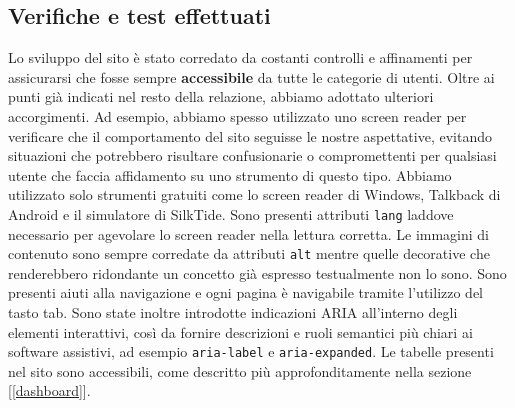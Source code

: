 \documentclass{article}
\begin{document}
\subsection{Verifiche e test effettuati}
Lo sviluppo del sito è stato corredato da costanti controlli e affinamenti per assicurarsi che fosse sempre \textbf{accessibile} da tutte le categorie di utenti. Oltre ai punti già indicati nel resto della relazione, abbiamo adottato ulteriori accorgimenti. Ad esempio, abbiamo spesso utilizzato uno screen reader per verificare che il comportamento del sito seguisse le nostre aspettative, evitando situazioni che potrebbero risultare confusionarie o compromettenti per qualsiasi utente che faccia affidamento su uno strumento di questo tipo. Abbiamo utilizzato solo strumenti gratuiti come lo screen reader di Windows, Talkback di Android e il simulatore di SilkTide. Sono presenti attributi \verb|lang| laddove necessario per agevolare lo screen reader nella lettura corretta. Le immagini di contenuto sono sempre corredate da attributi \verb|alt| mentre quelle decorative che renderebbero ridondante un concetto già espresso testualmente non lo sono. Sono presenti aiuti alla navigazione e ogni pagina è navigabile tramite l'utilizzo del tasto tab. Sono state inoltre introdotte indicazioni ARIA all'interno degli elementi interattivi, così da fornire descrizioni e ruoli semantici più chiari ai software assistivi, ad esempio \verb|aria-label| e \verb|aria-expanded|. Le tabelle presenti nel sito sono accessibili, come descritto più approfonditamente nella sezione [\ref{dashboard}].
\newpage
\end{document}
